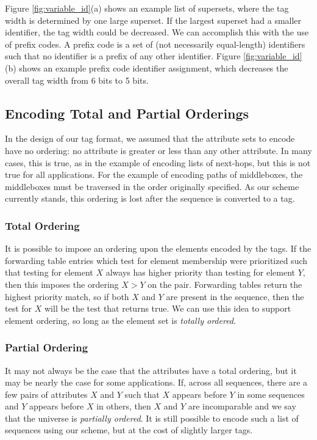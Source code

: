 Figure \ref{fig:variable_id}(a) shows an example list of supersets, where the tag width is determined by one large superset. If the largest superset had a smaller identifier, the tag width could be decreased. We can accomplish this with the use of prefix codes. A prefix code is a set of (not necessarily equal-length) identifiers such that no identifier is a prefix of any other identifier. Figure \ref{fig:variable_id}(b) shows an example prefix code identifier assignment, which decreases the overall tag width from 6 bits to 5 bits.






\subsection{Encoding Total and Partial Orderings}
In the design of our tag format, we assumed that the attribute sets to encode have no ordering: no attribute is greater or less than any other attribute. In many cases, this is true, as in the example of encoding lists of next-hops, but this is not true for all applications. For the example of encoding paths of middleboxes, the middleboxes must be traversed in the order originally specified. As our scheme currently stands, this ordering is lost after the sequence is converted to a tag. 

\subsubsection{Total Ordering}
It is possible to impose an ordering upon the elements encoded by the tags. If the forwarding table entries which test for element membership were prioritized such that testing for element $X$ always has higher priority than testing for element $Y$, then this imposes the ordering $X > Y$ on the pair. Forwarding tables return the highest priority match, so if both $X$ and $Y$ are present in the sequence, then the test for $X$ will be the test that returns true. We can use this idea to support element ordering, so long as the element set is \textit{totally ordered}.

\subsubsection{Partial Ordering}
It may not always be the case that the attributes have a total ordering, but it may be nearly the case for some applications. If, across all sequences, there are a few pairs of attributes $X$ and $Y$ such that $X$ appears before $Y$ in some sequences and $Y$ appears before $X$ in others, then $X$ and $Y$ are incomparable and we say that the universe is \textit{partially ordered}. It is still possible to encode such a list of sequences using our scheme, but at the cost of slightly larger tags.

